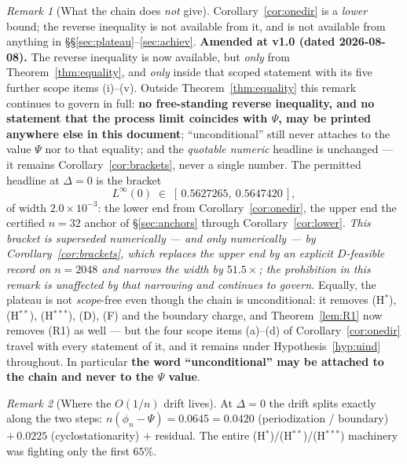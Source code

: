 \documentclass[11pt]{article}
\theoremstyle{definition}
\theoremstyle{remark}
\newtheorem{remark}{Remark}
\begin{document}
\begin{remark}[What the chain does \emph{not} give]
\label{rem:onedirection}
Corollary~\ref{cor:onedir} is a \emph{lower} bound; the reverse
inequality is not available from it, and is not available from anything in
\S\S\ref{sec:plateau}--\ref{sec:achiev}.
\textbf{Amended at v1.0 (dated 2026-08-08).} The reverse inequality is now
available, but \emph{only} from Theorem~\ref{thm:equality}, and \emph{only}
inside that scoped statement with its five further scope items (i)--(v).
Outside Theorem~\ref{thm:equality} this remark continues to govern in full:
\textbf{no free-standing reverse inequality, and no statement that the process
limit coincides with $\Psi$, may be printed anywhere else in this document};
``unconditional'' still never attaches to the value $\Psi$ nor to that
equality; and the \emph{quotable numeric} headline is unchanged --- it remains
Corollary~\ref{cor:brackets}, never a single number.
The permitted headline at $\Delta=0$ is the bracket
\[
L^\infty(0)\;\in\;[\,0.5627265,\ 0.5647420\,],
\]
of width $2.0\times10^{-3}$: the lower end from
Corollary~\ref{cor:onedir}, the upper end the certified $n=32$ anchor
of \S\ref{sec:anchors} through Corollary~\ref{cor:lower}. \emph{This
bracket is superseded numerically --- and only numerically --- by
Corollary~\ref{cor:brackets}, which replaces the upper end by an
explicit $D$-feasible record on $n=2048$ and narrows the width by
$51.5\times$; the prohibition in this remark is unaffected by that
narrowing and continues to govern.} Equally, the
plateau is not \emph{scope}-free even though the chain is
unconditional: it removes (H$^\ast$), (H$^{\ast\ast}$),
(H$^{\ast\ast\ast}$), (D), (F) and the boundary charge, and
Theorem~\ref{lem:R1} now removes (R1) as well --- but the four scope
items (a)--(d) of Corollary~\ref{cor:onedir} travel with every
statement of it, and it remains under Hypothesis~\ref{hyp:uind}
throughout. In particular \textbf{the word ``unconditional'' may be
attached to the chain and never to the $\Psi$ value}.
\end{remark}

\begin{remark}[Where the $O(1/n)$ drift lives]
\label{rem:drift}
At $\Delta=0$ the drift splits exactly along the two steps:
$n(\phi_n-\Psi)=0.0645=0.0420$ (periodization / boundary)
$+\,0.0225$ (cyclostationarity) $+$ residual. The entire
(H$^\ast$)/(H$^{\ast\ast}$)/(H$^{\ast\ast\ast}$) machinery was fighting
only the first $65\%$.
\end{remark}
\end{document}
